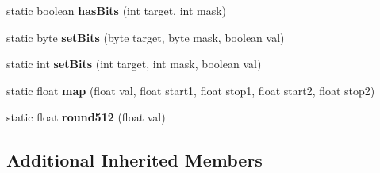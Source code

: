 \begin{DoxyCompactItemize}
\item 
\hypertarget{classhype_1_1core_1_1util_1_1_h_math_a2516da998620ad20a1000eb62bc6d687}{static boolean {\bfseries has\-Bits} (int target, int mask)}\label{classhype_1_1core_1_1util_1_1_h_math_a2516da998620ad20a1000eb62bc6d687}

\item 
\hypertarget{classhype_1_1core_1_1util_1_1_h_math_a175bba027f4cbddf7cf0b2e11cf91329}{static byte {\bfseries set\-Bits} (byte target, byte mask, boolean val)}\label{classhype_1_1core_1_1util_1_1_h_math_a175bba027f4cbddf7cf0b2e11cf91329}

\item 
\hypertarget{classhype_1_1core_1_1util_1_1_h_math_aa8ac36b75c338332e1897f7a2e6a6769}{static int {\bfseries set\-Bits} (int target, int mask, boolean val)}\label{classhype_1_1core_1_1util_1_1_h_math_aa8ac36b75c338332e1897f7a2e6a6769}

\item 
\hypertarget{classhype_1_1core_1_1util_1_1_h_math_a7fee6be7db8274defe2966a09002be89}{static float {\bfseries map} (float val, float start1, float stop1, float start2, float stop2)}\label{classhype_1_1core_1_1util_1_1_h_math_a7fee6be7db8274defe2966a09002be89}

\item 
\hypertarget{classhype_1_1core_1_1util_1_1_h_math_a90d63c9d2f523aa79a86225974ec025d}{static float {\bfseries round512} (float val)}\label{classhype_1_1core_1_1util_1_1_h_math_a90d63c9d2f523aa79a86225974ec025d}

\end{DoxyCompactItemize}
\subsection*{Additional Inherited Members}


